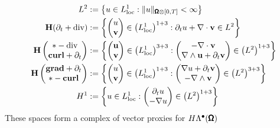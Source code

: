             \begin{align}
                L^{2}  &:=  \left\{u \in L^{1}_{\rm loc} : \|u\|_{\pmb{\mathsf{\Omega}}\otimes[0, T]} < \infty\right\}  \\
                \mathbf{H}(\partial_{t} + \mathrm{div})  &:=  \left\{\begin{pmatrix} u \\ \mathbf{v} \end{pmatrix} \in \left(L^{1}_{\rm loc}\right)^{1 + 3} : \partial_{t}u + \nabla\cdot\mathbf{v} \in L^{2}\right\}  \\
                \mathbf{H}\left(\begin{matrix} * - \mathrm{div} \\ \mathbf{curl} + \partial_{t} \end{matrix}\right)  &:=  \left\{\begin{pmatrix} \mathbf{u} \\ \mathbf{v} \end{pmatrix} \in \left(L^{1}_{\rm loc}\right)^{3 + 3} : \begin{pmatrix} - \nabla\cdot\mathbf{v} \\ \nabla\wedge\mathbf{u} + \partial_{t}\mathbf{v} \end{pmatrix} \in \left(L^{2}\right)^{1 + 3}\right\}  \\
                \mathbf{H}\left(\begin{matrix} \mathbf{grad} + \partial_{t} \\ * - \mathbf{curl} \end{matrix}\right)  &:=  \left\{\begin{pmatrix} u \\ \mathbf{v} \end{pmatrix} \in \left(L^{1}_{\rm loc}\right)^{1 + 3} : \begin{pmatrix} \nabla u + \partial_{t}\mathbf{v} \\ - \nabla\wedge\mathbf{v} \end{pmatrix} \in \left(L^{2}\right)^{3 + 3}\right\}  \\
                H^{1}  &:=  \left\{u \in L^{1}_{\rm loc} : \begin{pmatrix} \partial_{t}u \\ - \nabla u \end{pmatrix} \in \left(L^{2}\right)^{1 + 3}\right\}
            \end{align}
            These spaces form a complex of vector proxies for $H\Lambda^{\bullet}(\pmb{\mathsf{\Omega}})$ \BA{([Ref])}

